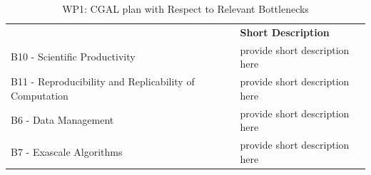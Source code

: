 \begin{table}[h!]
    \centering
    
    

    \centering
    { 
        \setlength{\parindent}{0pt}
        \def\arraystretch{1.25}
        {
            \fontsize{9}{11}\selectfont
            \begin{tabular}{!{\color{numpexgray}\vrule}p{.25\linewidth}!{\color{numpexgray}\vrule}p{.6885\linewidth}!{\color{numpexgray}\vrule}}
    
     &  {\rule{0pt}{2.5ex}\color{white}\bf Short Description }\\ 
    
    B10 - Scientific Productivity & provide short description here \\
    B11 - Reproducibility and Replicability of Computation & provide short description here \\
    B6 - Data Management & provide short description here \\
    B7 - Exascale Algorithms & provide short description here \\
\end{tabular}
        }
    }
    \caption{WP1: CGAL plan with Respect to Relevant Bottlenecks}
    \label{tab:WP1:CGAL:bottlenecks}
\end{table}


%
%
%
